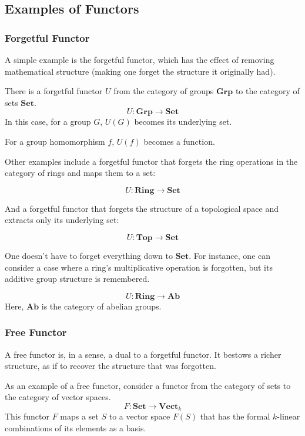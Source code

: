 \documentclass[uplatex,a4j,12pt,dvipdfmx]{jsarticle}
\begin{document}
\subsection{Examples of Functors}

\subsubsection{Forgetful Functor}

A simple example is the forgetful functor, which has the effect of removing mathematical structure (making one forget the structure it originally had).

There is a forgetful functor $U$ from the category of groups $\textbf{Grp}$ to the category of sets $\textbf{Set}$.
$$
	U : \textbf{Grp} \to \textbf{Set}
$$
In this case, for a group $G$, $U(G)$ becomes its underlying set.

For a group homomorphism $f$, $U(f)$ becomes a function.

Other examples include a forgetful functor that forgets the ring operations in the category of rings and maps them to a set:

$$U: \textbf{Ring} \to \textbf{Set}$$

And a forgetful functor that forgets the structure of a topological space and extracts only its underlying set:

$$U: \textbf{Top} \to \textbf{Set}$$

One doesn't have to forget everything down to $\textbf{Set}$. For instance, one can consider a case where a ring's multiplicative operation is forgotten, but its additive group structure is remembered.

$$ U : \textbf{Ring} \to \textbf{Ab} $$
Here, $\textbf{Ab}$ is the category of abelian groups.


\subsubsection{Free Functor}

A free functor is, in a sense, a dual to a forgetful functor. It bestows a richer structure, as if to recover the structure that was forgotten.

As an example of a free functor, consider a functor from the category of sets to the category of vector spaces.
$$F : \textbf{Set} \to \textbf{Vect}_{k}$$
This functor $F$ maps a set $S$ to a vector space $F(S)$ that has the formal $k$-linear combinations of its elements as a basis.
\end{document}
